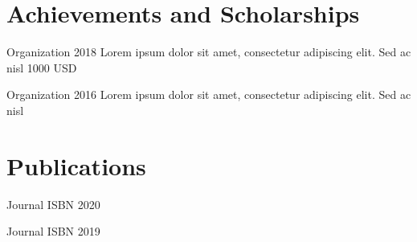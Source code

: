 \documentclass[english]{resume-template}
\begin{document}
\section{Achievements and Scholarships}
            {Organization}
            {2018}
            {
             Lorem ipsum dolor sit amet, consectetur adipiscing elit. Sed ac nisl
            }
            {1000 USD}

            {Organization}
            {2016}
            {
             Lorem ipsum dolor sit amet, consectetur adipiscing elit. Sed ac nisl
            }
            {}

\section{Publications}
            {Journal}
            {ISBN}
            {2020}

            {Journal}
            {ISBN}
            {2019}
\end{document}
